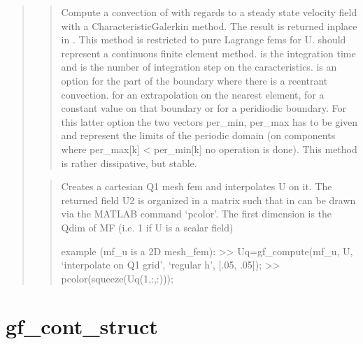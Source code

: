 \documentclass[a4paper,11pt,english]{sphinxmanual}
\begin{document}
\begin{quote}
\begin{quote}
Compute a convection of  with regards to a steady state velocity
field  with a Characteristic\sphinxhyphen{}Galerkin method. The result is returned
in\sphinxhyphen{}place in .
This method is restricted to pure Lagrange fems for U.  should
represent a continuous finite element method.  is the integration time
and  is the number of integration step on the caracteristics. 
is an option for the part of the boundary where there is a re\sphinxhyphen{}entrant
convection.
 for an extrapolation on the nearest element,
 for a constant value on that boundary or
 for a peridiodic boundary. For this latter option
the two vectors per\_min, per\_max has to be given and represent the limits
of the periodic domain (on components where per\_max{[}k{]} \textless{} per\_min{[}k{]}
no operation is done).
This method is rather dissipative, but stable.
\end{quote}

\begin{quote}

Creates a cartesian Q1 mesh fem and interpolates U on it. The
returned field U2 is organized in a matrix such that in can be drawn
via the MATLAB command ‘pcolor’. The first dimension is the Qdim of
MF (i.e.  1 if U is a scalar field)

example (mf\_u is a 2D mesh\_fem):
\textgreater{}\textgreater{} Uq=gf\_compute(mf\_u, U, ‘interpolate on Q1 grid’, ‘regular h’, {[}.05, .05{]});
\textgreater{}\textgreater{} pcolor(squeeze(Uq(1,:,:)));
\end{quote}
\end{quote}


\section{gf\_cont\_struct}
\label{\detokenize{matlab_octave/cmdref_gf_cont_struct:gf-cont-struct}}\label{\detokenize{matlab_octave/cmdref_gf_cont_struct::doc}}

\begin{sphinxVerbatim}[commandchars=\\\{\}]
     \PYG{p}{[}     \PYG{p}{]}  \PYG{p}{[} \PYG{p}{]}
\end{sphinxVerbatim}
\end{document}
